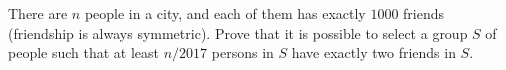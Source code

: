 There are \(n\) people in a city, and each of them has exactly \(1000\) friends (friendship is always symmetric). Prove that it is possible to select a group \(S\) of people such that at least \(n/2017\) persons in \(S\) have exactly two friends in \(S\).